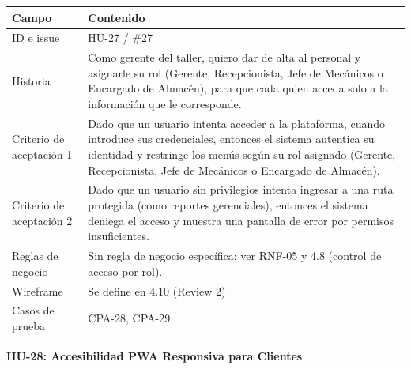 {\def\LTcaptype{none} %
\begin{longtable}[]{@{}
  >{\raggedright\arraybackslash}p{}
  >{\raggedright\arraybackslash}p{}@{}}
\toprule\noalign{}
\begin{minipage}[b]{\linewidth}\raggedright
\textbf{Campo}
\end{minipage} & \begin{minipage}[b]{\linewidth}\raggedright
\textbf{Contenido}
\end{minipage} \\
\midrule\noalign{}
\endhead
\bottomrule\noalign{}
\endlastfoot
ID e issue & HU-27 / \#27 \\
Historia & Como gerente del taller, quiero dar de alta al personal y
asignarle su rol (Gerente, Recepcionista, Jefe de Mecánicos o Encargado
de Almacén), para que cada quien acceda solo a la información que le
corresponde. \\
Criterio de aceptación 1 & Dado que un usuario intenta acceder a la
plataforma, cuando introduce sus credenciales, entonces el sistema
autentica su identidad y restringe los menús según su rol asignado
(Gerente, Recepcionista, Jefe de Mecánicos o Encargado de Almacén). \\
Criterio de aceptación 2 & Dado que un usuario sin privilegios intenta
ingresar a una ruta protegida (como reportes gerenciales), entonces el
sistema deniega el acceso y muestra una pantalla de error por permisos
insuficientes. \\
Reglas de negocio & Sin regla de negocio específica; ver RNF-05 y 4.8
(control de acceso por rol). \\
Wireframe & Se define en 4.10 (Review 2) \\
Casos de prueba & CPA-28, CPA-29 \\
\end{longtable}
}

\textbf{HU-28: Accesibilidad PWA Responsiva para Clientes}

